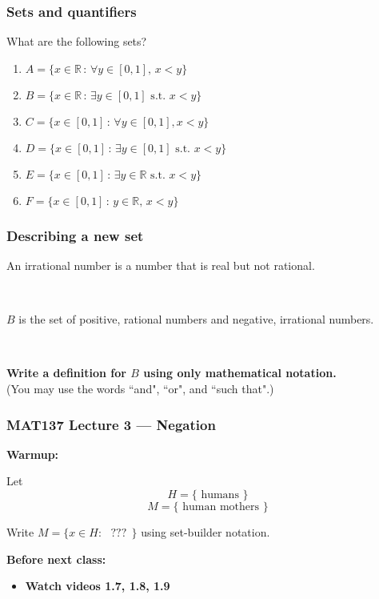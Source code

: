\documentclass[14pt]{beamer}
\newcommand {\DS} [1] {${\displaystyle #1}$}
\newcommand {\R}{\mathbb{R}}
\begin{document}
\begin{frame}
\frametitle{Sets and quantifiers}

What are the following sets?

	\begin{enumerate}
		\item  \DS{A = \{ x \in \R \, : \, \forall y \in [0,1], \, x < y \} }
		\item  \DS{B = \{ x \in \R \, : \, \exists y \in [0,1] \mbox{ s.t. } x < y \} }
		\item  \DS{C = \{ x \in [0,1] \, : \, \forall y \in [0,1], x < y \} }
		\item  \DS{D = \{ x \in [0,1] \, : \, \exists y \in [0,1] \mbox{ s.t. } x < y \} }
		\item  \DS{E = \{ x \in [0,1] \, : \, \exists y \in \R \mbox{ s.t. } x < y \} }
		\item  \DS{F = \{ x \in [0,1] \, : \, y \in \R, \, x < y \} } 
	\end{enumerate}
\end{frame}

\begin{frame}
\frametitle{Describing a new set}

An irrational number is a number that is real but not rational.

\


$B$ is the set of positive, rational numbers and negative, irrational numbers.

\

	{\bfseries Write a definition for $B$ using only mathematical notation.} \\
 (You may use the words ``and", ``or", and ``such that".)
 \end{frame}

\begin{frame}
\frametitle{MAT137 Lecture 3 --- Negation}
	\textbf{Warmup:}
	\vfill

	Let \[H=\{\text{ humans }\}\]
	\[M=\{\text{ human mothers }\}\]

	Write $M=\{x\in H:\ \ \ ??? \ \  \}$ using set-builder notation.

	\vfill
	{\bf Before next class:}
		\begin{itemize} \normalsize
			\item {\bf Watch videos 1.7, 1.8, 1.9 }
		\end{itemize}
	\vfill

\end{frame}
\end{document}
